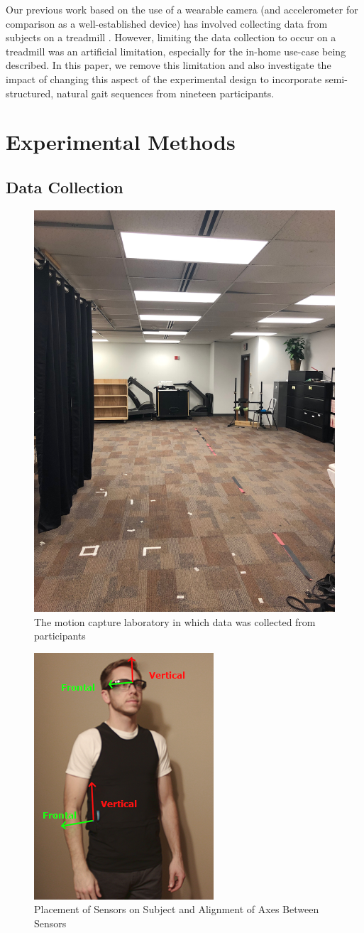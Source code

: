 \documentclass[12pt]{report}
\begin{document}
Our previous work based on the use of a wearable camera (and accelerometer for comparison as a well-established device) has involved collecting data from subjects on a treadmill \cite{Schneider2017}. However, limiting the data collection to occur on a treadmill was an artificial limitation, especially for the in-home use-case being described. In this paper, we remove this limitation and also investigate the impact of changing this aspect of the experimental design to incorporate semi-structured, natural gait sequences from nineteen participants.

\section{Experimental Methods}

\subsection{Data Collection}

\begin{figure}[!t]
\centering
\includegraphics[width=1.8 in]{figure/MoCapRoom}
\caption{The motion capture laboratory in which data was collected from participants}
\label{fig_mocap}
\end{figure}

\begin{figure}[!t]
\centering
\includegraphics[width=1.8 in]{figure/sensorAlign}
\caption{Placement of Sensors on Subject and Alignment of Axes Between Sensors}
\label{fig_axes}
\end{figure}
\end{document}
